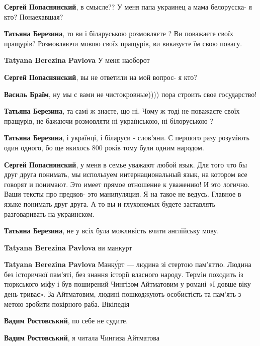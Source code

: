 \begin{itemize}
\begin{itemize}
\textbf{Сергей Попаснянский}, в смысле?? У меня папа украинец а мама белорусска- я кто? Понаехавшая?

\textbf{Татьяна Березина}, то ви і біларуською розмовляєте ? Ви поважаєте своїх
пращурів? Розмовляючи мовою своїх пращурів, ви виказуєте їм свою повагу.

\textbf{Tatyana Berezina Pavlova} У меня наоборот

\textbf{Сергей Попаснянский}, вы не ответили на мой вопрос- я кто?

\textbf{Василь Браїм}, ну мы с вами не чистокровные)))) пора строить свое государство!

\textbf{Татьяна Березина}, та самі ж знаєте, що ні. Чому ж тоді не поважаєте
своїх пращурів, не бажаючи розмовляти ні українською, ні білоруською ?

\textbf{Татьяна Березина}, і українці, і біларуси - слов'яни. С першого разу
розуміють один одного, бо ще якихось 800 років тому були одним народом.

\textbf{Сергей Попаснянский}, у меня в семье уважают любой язык. Для того что
бы друг друга понимать, мы используем интернациональный язык, на котором все
говорят и понимают. Это имеет прямое отношение к уважению! И это логично. Ваши
тексты про предков- это манипуляция. Я на такое не ведусь. Главное в языке
понимать друг друга. А то вы и глухонемых будете заставлять разговаривать на
украинском.

\textbf{Татьяна Березина}, не у всіх була можливість вчити англійську мову.

\textbf{Tatyana Berezina Pavlova} ви манкурт

\textbf{Tatyana Berezina Pavlova} Манку́рт — людина зі стертою пам'яттю. Людина
без історичної пам'яті, без знання історії власного народу. Термін походить із
тюркського міфу і був поширений Чингізом Айтматовим у романі «І довше віку день
триває». За Айтматовим, людині пошкоджують особистість та пам'ять з метою
зробити покірного раба. Вікіпедія

\textbf{Вадим Ростовський}, по себе не судите.

\textbf{Вадим Ростовський}, я читала Чингиза Айтматова


\end{itemize}
\end{itemize}

